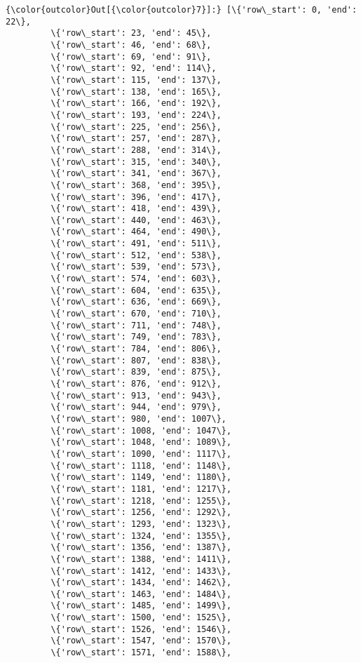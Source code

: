 \documentclass[11pt]{article}
\begin{document}
\begin{Verbatim}[commandchars=\\\{\}]
{\color{outcolor}Out[{\color{outcolor}7}]:} [\{'row\_start': 0, 'end': 22\},
         \{'row\_start': 23, 'end': 45\},
         \{'row\_start': 46, 'end': 68\},
         \{'row\_start': 69, 'end': 91\},
         \{'row\_start': 92, 'end': 114\},
         \{'row\_start': 115, 'end': 137\},
         \{'row\_start': 138, 'end': 165\},
         \{'row\_start': 166, 'end': 192\},
         \{'row\_start': 193, 'end': 224\},
         \{'row\_start': 225, 'end': 256\},
         \{'row\_start': 257, 'end': 287\},
         \{'row\_start': 288, 'end': 314\},
         \{'row\_start': 315, 'end': 340\},
         \{'row\_start': 341, 'end': 367\},
         \{'row\_start': 368, 'end': 395\},
         \{'row\_start': 396, 'end': 417\},
         \{'row\_start': 418, 'end': 439\},
         \{'row\_start': 440, 'end': 463\},
         \{'row\_start': 464, 'end': 490\},
         \{'row\_start': 491, 'end': 511\},
         \{'row\_start': 512, 'end': 538\},
         \{'row\_start': 539, 'end': 573\},
         \{'row\_start': 574, 'end': 603\},
         \{'row\_start': 604, 'end': 635\},
         \{'row\_start': 636, 'end': 669\},
         \{'row\_start': 670, 'end': 710\},
         \{'row\_start': 711, 'end': 748\},
         \{'row\_start': 749, 'end': 783\},
         \{'row\_start': 784, 'end': 806\},
         \{'row\_start': 807, 'end': 838\},
         \{'row\_start': 839, 'end': 875\},
         \{'row\_start': 876, 'end': 912\},
         \{'row\_start': 913, 'end': 943\},
         \{'row\_start': 944, 'end': 979\},
         \{'row\_start': 980, 'end': 1007\},
         \{'row\_start': 1008, 'end': 1047\},
         \{'row\_start': 1048, 'end': 1089\},
         \{'row\_start': 1090, 'end': 1117\},
         \{'row\_start': 1118, 'end': 1148\},
         \{'row\_start': 1149, 'end': 1180\},
         \{'row\_start': 1181, 'end': 1217\},
         \{'row\_start': 1218, 'end': 1255\},
         \{'row\_start': 1256, 'end': 1292\},
         \{'row\_start': 1293, 'end': 1323\},
         \{'row\_start': 1324, 'end': 1355\},
         \{'row\_start': 1356, 'end': 1387\},
         \{'row\_start': 1388, 'end': 1411\},
         \{'row\_start': 1412, 'end': 1433\},
         \{'row\_start': 1434, 'end': 1462\},
         \{'row\_start': 1463, 'end': 1484\},
         \{'row\_start': 1485, 'end': 1499\},
         \{'row\_start': 1500, 'end': 1525\},
         \{'row\_start': 1526, 'end': 1546\},
         \{'row\_start': 1547, 'end': 1570\},
         \{'row\_start': 1571, 'end': 1588\},

\end{Verbatim}
\end{document}
